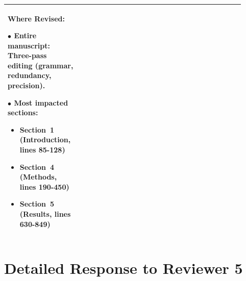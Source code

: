 \documentclass[11pt,a4paper]{article}
\begin{document}
\begin{longtable}{>{\raggedright\arraybackslash}p{0.26\linewidth}|>{\raggedright\arraybackslash}p{0.44\linewidth}|>{\raggedright\arraybackslash}p{0.22\linewidth}}
\textbf{Where Revised:}

$\bullet$ \textbf{Entire manuscript}: Three-pass editing (grammar, redundancy, precision).

$\bullet$ \textbf{Most impacted sections}:
\begin{itemize}
    \item Section~1 (Introduction, lines 85-128)
    \item Section~4 (Methods, lines 190-450)
    \item Section~5 (Results, lines 630-849)
\end{itemize} \\

\bottomrule
\end{longtable}


\section*{Detailed Response to Reviewer 5}
\end{document}
